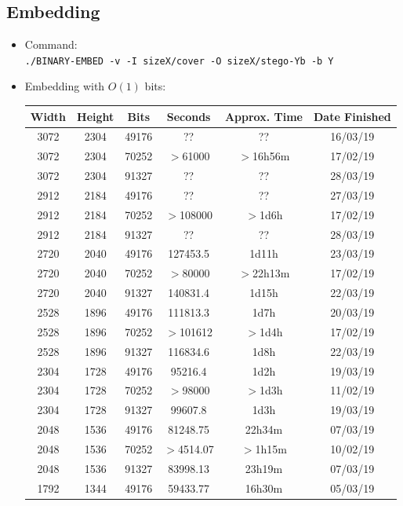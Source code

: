 \documentclass[11pt,a4paper]{report}
\begin{document}
\subsection{Embedding}
\begin{itemize}
\item Command: \\
  \texttt{./BINARY-EMBED -v -I sizeX/cover -O sizeX/stego-Yb -b Y}

\item Embedding with $O(1)$ bits:
  \begin{center}
  \begin{tabular}{ c c c | c c c }
  Width & Height & Bits & Seconds & Approx. Time & Date Finished \\ \hline
  3072 & 2304 & 49176 & ?? & ?? & 16/03/19 \\ %
  3072 & 2304 & 70252 & $>$61000 & $>$16h56m & 17/02/19 \\
  3072 & 2304 & 91327 & ?? & ?? & 28/03/19 \\ %
  2912 & 2184 & 49176 & ?? & ?? & 27/03/19 \\ %
  2912 & 2184 & 70252 & $>$108000 & $>$1d6h & 17/02/19 \\
  2912 & 2184 & 91327 & ?? & ?? & 28/03/19 \\ %
  2720 & 2040 & 49176 & 127453.5 & 1d11h & 23/03/19 \\
  2720 & 2040 & 70252 & $>$80000 & $>$22h13m & 17/02/19 \\
  2720 & 2040 & 91327 & 140831.4 & 1d15h & 22/03/19 \\
  2528 & 1896 & 49176 & 111813.3 & 1d7h & 20/03/19 \\
  2528 & 1896 & 70252 & $>$101612 & $>$1d4h & 17/02/19 \\
  2528 & 1896 & 91327 & 116834.6 & 1d8h & 22/03/19 \\
  2304 & 1728 & 49176 & 95216.4 & 1d2h & 19/03/19 \\
  2304 & 1728 & 70252 & $>$98000 & $>$1d3h & 11/02/19 \\
  2304 & 1728 & 91327 & 99607.8 & 1d3h & 19/03/19 \\
  2048 & 1536 & 49176 & 81248.75 & 22h34m & 07/03/19 \\
  2048 & 1536 & 70252 & $>$4514.07 & $>$1h15m & 10/02/19 \\
  2048 & 1536 & 91327 & 83998.13 & 23h19m & 07/03/19 \\
  1792 & 1344 & 49176 & 59433.77 & 16h30m & 05/03/19 \\

\end{tabular}
\end{center}
\end{itemize}
\end{document}
